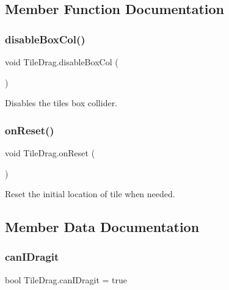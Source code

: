 \subsection{Member Function Documentation}
\mbox{\label{class_tile_drag_a2ac05ed0439d4c9467aef8a0304d5432}} 
\subsubsection{\texorpdfstring{disable\+Box\+Col()}{disableBoxCol()}}
{\footnotesize\ttfamily void Tile\+Drag.\+disable\+Box\+Col (\begin{DoxyParamCaption}{ }\end{DoxyParamCaption})}



Disables the tile\textquotesingle{}s box collider. 

\mbox{\label{class_tile_drag_a1e6de5920e24560c0e2dc78663d476de}} 
\subsubsection{\texorpdfstring{on\+Reset()}{onReset()}}
{\footnotesize\ttfamily void Tile\+Drag.\+on\+Reset (\begin{DoxyParamCaption}{ }\end{DoxyParamCaption})}



Reset the initial location of tile when needed. 



\subsection{Member Data Documentation}
\mbox{\label{class_tile_drag_a24edf4664b06aaffd113f728a57867e3}} 
\subsubsection{\texorpdfstring{can\+I\+Dragit}{canIDragit}}
{\footnotesize\ttfamily bool Tile\+Drag.\+can\+I\+Dragit = true}

